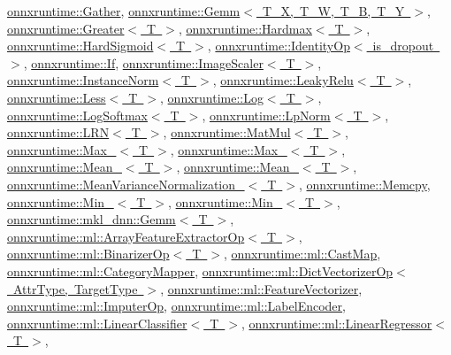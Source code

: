 \mbox{\hyperlink{classonnxruntime_1_1Gather}{onnxruntime\+::\+Gather}}, \mbox{\hyperlink{classonnxruntime_1_1Gemm}{onnxruntime\+::\+Gemm$<$ T\+\_\+\+X, T\+\_\+\+W, T\+\_\+\+B, T\+\_\+\+Y $>$}}, \mbox{\hyperlink{classonnxruntime_1_1Greater}{onnxruntime\+::\+Greater$<$ T $>$}}, \mbox{\hyperlink{classonnxruntime_1_1Hardmax}{onnxruntime\+::\+Hardmax$<$ T $>$}}, \mbox{\hyperlink{classonnxruntime_1_1HardSigmoid}{onnxruntime\+::\+Hard\+Sigmoid$<$ T $>$}}, \mbox{\hyperlink{classonnxruntime_1_1IdentityOp}{onnxruntime\+::\+Identity\+Op$<$ is\+\_\+dropout $>$}}, \mbox{\hyperlink{classonnxruntime_1_1If}{onnxruntime\+::\+If}}, \mbox{\hyperlink{classonnxruntime_1_1ImageScaler}{onnxruntime\+::\+Image\+Scaler$<$ T $>$}}, \mbox{\hyperlink{classonnxruntime_1_1InstanceNorm}{onnxruntime\+::\+Instance\+Norm$<$ T $>$}}, \mbox{\hyperlink{classonnxruntime_1_1LeakyRelu}{onnxruntime\+::\+Leaky\+Relu$<$ T $>$}}, \mbox{\hyperlink{classonnxruntime_1_1Less}{onnxruntime\+::\+Less$<$ T $>$}}, \mbox{\hyperlink{classonnxruntime_1_1Log}{onnxruntime\+::\+Log$<$ T $>$}}, \mbox{\hyperlink{classonnxruntime_1_1LogSoftmax}{onnxruntime\+::\+Log\+Softmax$<$ T $>$}}, \mbox{\hyperlink{classonnxruntime_1_1LpNorm}{onnxruntime\+::\+Lp\+Norm$<$ T $>$}}, \mbox{\hyperlink{classonnxruntime_1_1LRN}{onnxruntime\+::\+L\+R\+N$<$ T $>$}}, \mbox{\hyperlink{classonnxruntime_1_1MatMul}{onnxruntime\+::\+Mat\+Mul$<$ T $>$}}, \mbox{\hyperlink{classonnxruntime_1_1Max__6}{onnxruntime\+::\+Max\+\_$<$ T $>$}}, \mbox{\hyperlink{classonnxruntime_1_1Max__8}{onnxruntime\+::\+Max\+\_$<$ T $>$}}, \mbox{\hyperlink{classonnxruntime_1_1Mean__6}{onnxruntime\+::\+Mean\+\_$<$ T $>$}}, \mbox{\hyperlink{classonnxruntime_1_1Mean__8}{onnxruntime\+::\+Mean\+\_$<$ T $>$}}, \mbox{\hyperlink{classonnxruntime_1_1MeanVarianceNormalization__0}{onnxruntime\+::\+Mean\+Variance\+Normalization\+\_$<$ T $>$}}, \mbox{\hyperlink{classonnxruntime_1_1Memcpy}{onnxruntime\+::\+Memcpy}}, \mbox{\hyperlink{classonnxruntime_1_1Min__6}{onnxruntime\+::\+Min\+\_$<$ T $>$}}, \mbox{\hyperlink{classonnxruntime_1_1Min__8}{onnxruntime\+::\+Min\+\_$<$ T $>$}}, \mbox{\hyperlink{classonnxruntime_1_1mkl__dnn_1_1Gemm}{onnxruntime\+::mkl\+\_\+dnn\+::\+Gemm$<$ T $>$}}, \mbox{\hyperlink{classonnxruntime_1_1ml_1_1ArrayFeatureExtractorOp}{onnxruntime\+::ml\+::\+Array\+Feature\+Extractor\+Op$<$ T $>$}}, \mbox{\hyperlink{classonnxruntime_1_1ml_1_1BinarizerOp}{onnxruntime\+::ml\+::\+Binarizer\+Op$<$ T $>$}}, \mbox{\hyperlink{classonnxruntime_1_1ml_1_1CastMap}{onnxruntime\+::ml\+::\+Cast\+Map}}, \mbox{\hyperlink{classonnxruntime_1_1ml_1_1CategoryMapper}{onnxruntime\+::ml\+::\+Category\+Mapper}}, \mbox{\hyperlink{classonnxruntime_1_1ml_1_1DictVectorizerOp}{onnxruntime\+::ml\+::\+Dict\+Vectorizer\+Op$<$ Attr\+Type, Target\+Type $>$}}, \mbox{\hyperlink{classonnxruntime_1_1ml_1_1FeatureVectorizer}{onnxruntime\+::ml\+::\+Feature\+Vectorizer}}, \mbox{\hyperlink{classonnxruntime_1_1ml_1_1ImputerOp}{onnxruntime\+::ml\+::\+Imputer\+Op}}, \mbox{\hyperlink{classonnxruntime_1_1ml_1_1LabelEncoder}{onnxruntime\+::ml\+::\+Label\+Encoder}}, \mbox{\hyperlink{classonnxruntime_1_1ml_1_1LinearClassifier}{onnxruntime\+::ml\+::\+Linear\+Classifier$<$ T $>$}}, \mbox{\hyperlink{classonnxruntime_1_1ml_1_1LinearRegressor}{onnxruntime\+::ml\+::\+Linear\+Regressor$<$ T $>$}}, 